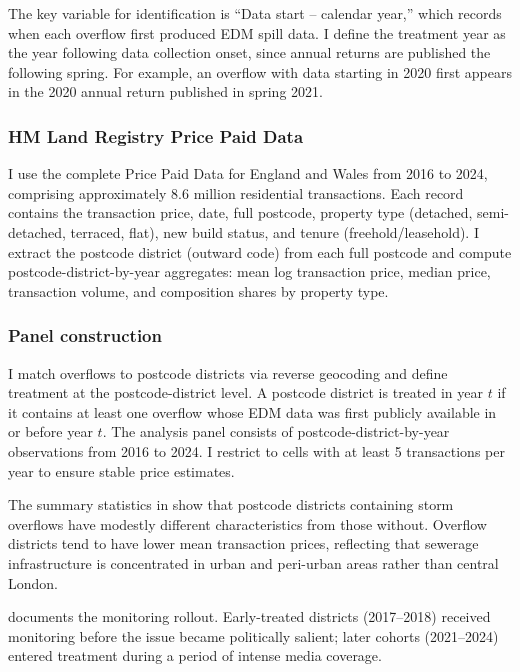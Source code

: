 \documentclass[12pt]{article}
\begin{document}
The key variable for identification is ``Data start -- calendar year,'' which records when each overflow first produced EDM spill data. I define the treatment year as the year following data collection onset, since annual returns are published the following spring. For example, an overflow with data starting in 2020 first appears in the 2020 annual return published in spring 2021.

\subsubsection*{HM Land Registry Price Paid Data} I use the complete Price Paid Data for England and Wales from 2016 to 2024, comprising approximately 8.6 million residential transactions. Each record contains the transaction price, date, full postcode, property type (detached, semi-detached, terraced, flat), new build status, and tenure (freehold/leasehold). I extract the postcode district (outward code) from each full postcode and compute postcode-district-by-year aggregates: mean log transaction price, median price, transaction volume, and composition shares by property type.

\subsubsection*{Panel construction} I match overflows to postcode districts via reverse geocoding and define treatment at the postcode-district level. A postcode district is treated in year $t$ if it contains at least one overflow whose EDM data was first publicly available in or before year $t$. The analysis panel consists of postcode-district-by-year observations from 2016 to 2024. I restrict to cells with at least 5 transactions per year to ensure stable price estimates.



The summary statistics in  show that postcode districts containing storm overflows have modestly different characteristics from those without. Overflow districts tend to have lower mean transaction prices, reflecting that sewerage infrastructure is concentrated in urban and peri-urban areas rather than central London.



 documents the monitoring rollout. Early-treated districts (2017--2018) received monitoring before the issue became politically salient; later cohorts (2021--2024) entered treatment during a period of intense media coverage.
\end{document}
